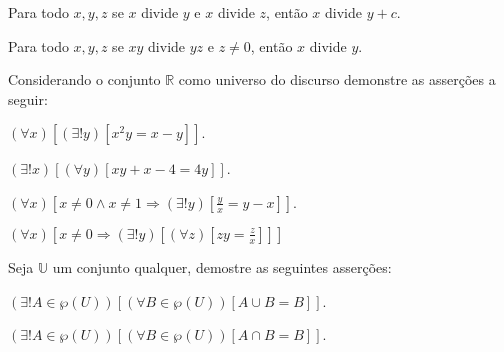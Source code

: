 \begin{exerList}
	\item Para todo $x, y, z$ se $x$ divide $y$ e $x$ divide $z$, então $x$ divide $y + c$.
	\item Para todo $x, y, z$ se $xy$ divide $yz$ e $z \neq 0$, então $x$ divide $y$.
\end{exerList}

\begin{problem}\label{prob:Demosntracoes14}
	Considerando o conjunto $ \mathbb{R}$ como universo do discurso demonstre as asserções a seguir:
\end{problem}

\begin{exerList}
	\item $(\forall x)[(\exists ! y)[x^2y = x - y]]$.
	\item $(\exists ! x)[(\forall y)[xy + x - 4 = 4y]]$.
	\item $(\forall x)[x \neq 0 \land x \neq 1 \Rightarrow (\exists! y)[\frac{y}{x} = y-x]]$.
	\item $(\forall x)[x \neq 0 \Rightarrow (\exists ! y)[(\forall z)[zy = \frac{z}{x}]]]$
\end{exerList}

\begin{problem}\label{prob:Demosntracoes15}
	Seja $\mathbb{U}$ um conjunto qualquer, demostre as seguintes asserções:
\end{problem}

\begin{exerList}
	\item $(\exists! A \in \wp(U))[(\forall B \in \wp(U))[A \cup B = B]]$.
	\item $(\exists! A \in \wp(U))[(\forall B \in \wp(U))[A \cap B = B]]$.
\end{exerList}